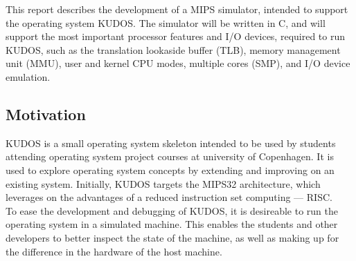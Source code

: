This report describes the development of a MIPS simulator, intended to support
the operating system KUDOS. The simulator will be written in C, and will
support the most important processor features and I/O devices, required to run
KUDOS, such as the translation lookaside
buffer (TLB), memory management unit (MMU), user and kernel CPU modes,
multiple cores (SMP), and I/O device emulation. \\


\subsection{Motivation}
KUDOS is a small operating system skeleton intended to be used by students
attending operating system project courses at university of Copenhagen.
It is used to explore operating system concepts by extending and improving on
an existing system.
Initially, KUDOS targets the MIPS32 architecture, which leverages on the
advantages of a
reduced instruction set computing --- RISC.\\
To ease the development and debugging of KUDOS, it is desireable to run the
operating system
in a simulated machine. This enables the students and other developers to
better inspect the state of the machine, as well as making up
for the difference in the hardware of the host machine.


